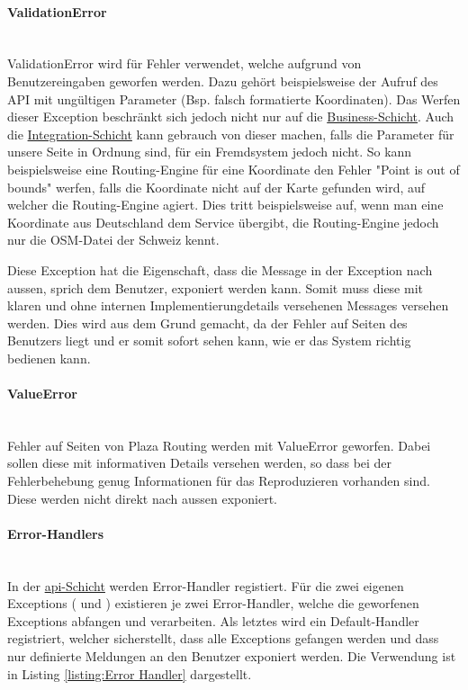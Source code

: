 \paragraph{ValidationError}\label{ehp:PR:ValidationErrorr}~\\
ValidationError wird für Fehler verwendet, welche aufgrund von Benutzereingaben geworfen werden. Dazu gehört beispielsweise der Aufruf des \ac{API} mit ungültigen Parameter (Bsp. falsch formatierte Koordinaten). Das Werfen dieser Exception beschränkt sich jedoch nicht nur auf die \hyperref[architektur:business-layer]{Business-Schicht}. Auch die \hyperref[architektur:integration-layer]{Integration-Schicht} kann gebrauch von dieser machen, falls die Parameter für unsere Seite in Ordnung sind, für ein Fremdsystem jedoch nicht. So kann beispielsweise eine Routing-Engine für eine Koordinate den Fehler "Point is out of bounds" werfen, falls die Koordinate nicht auf der Karte gefunden wird, auf welcher die Routing-Engine agiert. Dies tritt beispielsweise auf, wenn man eine Koordinate aus Deutschland dem Service übergibt, die Routing-Engine jedoch nur die \ac{OSM}-Datei der Schweiz kennt.

Diese Exception hat die Eigenschaft, dass die Message in der Exception nach aussen, sprich dem Benutzer, exponiert werden kann. Somit muss diese mit klaren und ohne internen Implementierungdetails versehenen Messages versehen werden. Dies wird aus dem Grund gemacht, da der Fehler auf Seiten des Benutzers liegt und er somit sofort sehen kann, wie er das System richtig bedienen kann.

\paragraph{ValueError}\label{ehp:PR:ValueError}~\\
Fehler auf Seiten von Plaza Routing werden mit ValueError geworfen. Dabei sollen diese mit informativen Details versehen werden, so dass bei der Fehlerbehebung genug Informationen für das Reproduzieren vorhanden sind. Diese werden nicht direkt nach aussen exponiert.

\paragraph{Error-Handlers}\label{ehp:Error Handlers}~\\
In der \hyperref[architektur:api-layer]{api-Schicht} werden Error-Handler registiert. Für die zwei eigenen Exceptions ( und ) existieren je zwei Error-Handler, welche die geworfenen Exceptions abfangen und verarbeiten. Als letztes wird ein Default-Handler registriert, welcher sicherstellt, dass alle Exceptions gefangen werden und dass nur definierte Meldungen an den Benutzer exponiert werden. Die Verwendung ist in Listing \ref{listing:Error Handler} dargestellt.

